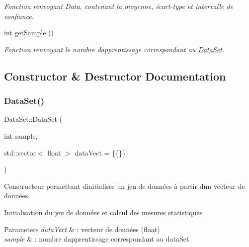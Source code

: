 \begin{DoxyCompactItemize}
\begin{DoxyCompactList}\small\item\em Fonction renvoyant Data, contenant la moyenne, écart-\/type et intervalle de confiance. \end{DoxyCompactList}\item 
\mbox{\label{classDataSet_a29e3936319d5b2fda4f74b033c556766}} 
int \hyperlink{classDataSet_a29e3936319d5b2fda4f74b033c556766}{get\+Sample} ()
\begin{DoxyCompactList}\small\item\em Fonction renvoyant le nombre d\textquotesingle{}apprentissage correspondant au \hyperlink{classDataSet}{Data\+Set}. \end{DoxyCompactList}\end{DoxyCompactItemize}


\subsection{Constructor \& Destructor Documentation}
\mbox{\label{classDataSet_ab45c95dc19f12a9217c0f3da7ac92b6a}} 
\subsubsection{\texorpdfstring{Data\+Set()}{DataSet()}}
{\footnotesize\ttfamily Data\+Set\+::\+Data\+Set (\begin{DoxyParamCaption}\item[{int}]{sample,  }\item[{std\+::vector$<$ float $>$}]{data\+Vect = {\ttfamily \{\{\}\}} }\end{DoxyParamCaption})}



Constructeur permettant d\textquotesingle{}initialiser un jeu de données à partir d\textquotesingle{}un vecteur de données. 

Initialisation du jeu de données et calcul des mesures statistiques 
\begin{DoxyParams}{Parameters}
{\em data\+Vect} & \+: vecteur de données (float) \\
\hline
{\em sample} & \+: nombre d\textquotesingle{}apprentissage correspondant au data\+Set \\
\hline
\end{DoxyParams}


